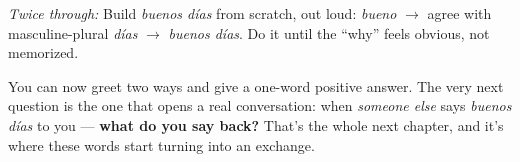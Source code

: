 \emph{Twice through:} Build \emph{buenos días} from scratch, out loud: \emph{bueno} $\to$ agree with masculine-plural \emph{días} $\to$ \emph{buenos días}. Do it until the \textquotedblleft{}why\textquotedblright{} feels obvious, not memorized.

\begin{tcolorbox}[breakable,colback=teal!4,colframe=teal!35!black,title={Before you move on}]
You can now greet two ways and give a one-word positive answer. The very next question is the one that opens a real conversation: when \emph{someone else} says \emph{buenos días} to you — \textbf{what do you say back?} That's the whole next chapter, and it's where these words start turning into an exchange.
\end{tcolorbox}
